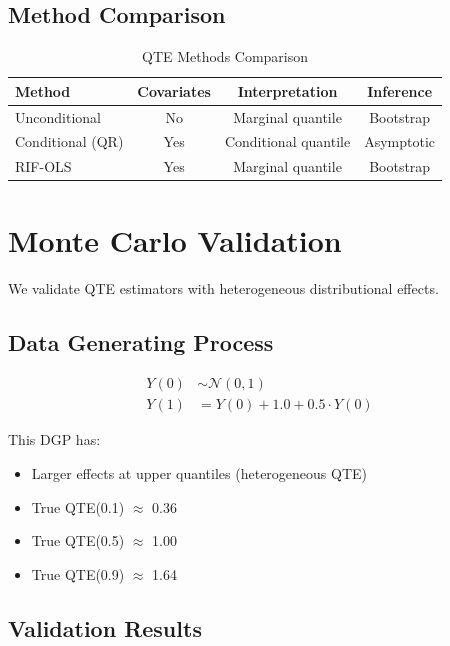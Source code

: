 \subsection{Method Comparison}

\begin{table}[htbp]
\centering
\caption{QTE Methods Comparison}
\label{tab:qte-methods}
\begin{tabular}{lccc}
\toprule
Method & Covariates & Interpretation & Inference \\
\midrule
Unconditional & No & Marginal quantile & Bootstrap \\
Conditional (QR) & Yes & Conditional quantile & Asymptotic \\
RIF-OLS & Yes & Marginal quantile & Bootstrap \\
\bottomrule
\end{tabular}
\end{table}

\section{Monte Carlo Validation}
\label{sec:qte-validation}

We validate QTE estimators with heterogeneous distributional effects.

\subsection{Data Generating Process}

\begin{align}
Y(0) &\sim \mathcal{N}(0, 1) \nonumber \\
Y(1) &= Y(0) + 1.0 + 0.5 \cdot Y(0) \label{eq:qte-dgp}
\end{align}

This DGP has:
\begin{itemize}
    \item Larger effects at upper quantiles (heterogeneous QTE)
    \item True QTE(0.1) $\approx$ 0.36
    \item True QTE(0.5) $\approx$ 1.00
    \item True QTE(0.9) $\approx$ 1.64
\end{itemize}

\subsection{Validation Results}

